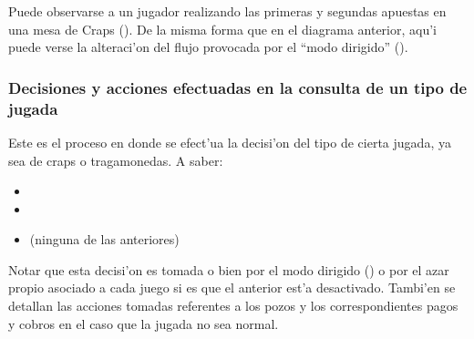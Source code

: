 
Puede observarse a un jugador realizando las primeras y segundas apuestas en una mesa de Craps ().
De la misma forma que en el diagrama anterior, aqu'i puede verse la alteraci'on del flujo provocada por el ``modo dirigido'' ().

\clearpage





\subsubsection{Decisiones y acciones efectuadas en la consulta de un tipo de jugada}
Este es el proceso en donde se efect'ua la decisi'on del tipo de cierta jugada, ya sea de craps o tragamonedas. A saber:

\begin{itemize}
  \item {}
  \item {} 
  \item {} (ninguna de las anteriores)
\end{itemize}

Notar que esta decisi'on es tomada o bien por el modo dirigido () o por el azar propio asociado a cada juego si es que el anterior est'a desactivado. Tambi'en se detallan las acciones tomadas referentes a los pozos y los correspondientes pagos y cobros en el caso que la jugada no sea normal.





